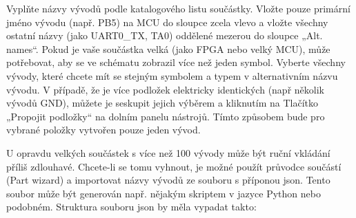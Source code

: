 \documentclass[letterpaper,10pt,czech]{sphinxmanual}
\begin{document}
Vyplňte názvy vývodů podle katalogového listu součástky. Vložte pouze primární jméno vývodu (např. PB5) na MCU do sloupce zcela vlevo a vložte všechny ostatní názvy (jako UART0\_TX, TA0) oddělené mezerou do sloupce „Alt. names“. Pokud je vaše součástka  velká (jako FPGA nebo velký MCU), může potřebovat, aby se ve schématu zobrazil více než jeden symbol. Vyberte všechny vývody, které chcete mít se stejným symbolem a typem v alternativním názvu vývodu. V případě, že je více podložek elektricky identických (např
několik vývodů GND), můžete je seskupit jejich výběrem a kliknutím na
Tlačítko „Propojit podložky“ na dolním panelu nástrojů. Tímto způsobem bude pro vybrané položky vytvořen pouze jeden vývod.

U opravdu velkých součástek s více než 100 vývody může být ruční vkládání příliš zdlouhavé. Chcete-li se tomu vyhnout, je možné použít průvodce součástí (Part wizard) a importovat názvy vývodů ze souboru s příponou json. Tento soubor může být generován např. nějakým skriptem v jazyce Python nebo podobném. Struktura souboru json by měla vypadat takto:

\begin{sphinxVerbatim}[commandchars=\\\{\}]
        \PYG{p}{[} \PYG{p}{]} 
        \PYG{p}{[} \PYG{p}{]} 
\end{sphinxVerbatim}
\end{document}
